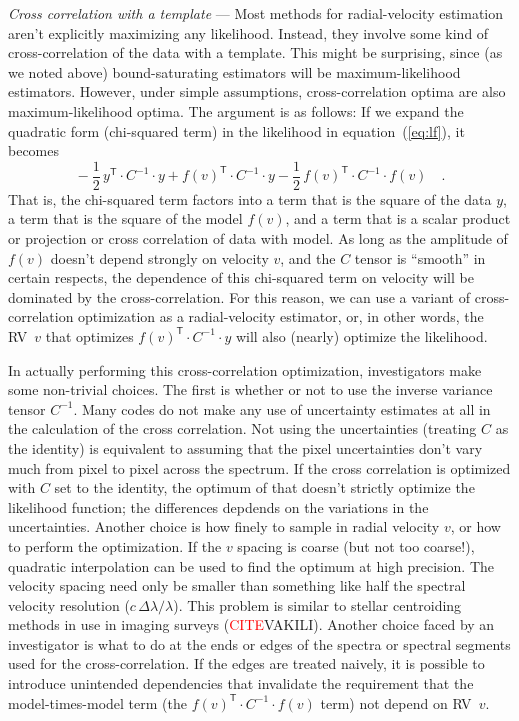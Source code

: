 \documentclass[modern]{aastex631}
\newcommand{\T}{^{\mathsf{T}}}
\renewcommand{\paragraph}[1]{\bigskip\par\noindent\textsl{#1} ---}
\newcommand{\todo}[1]{\textcolor{red}{#1}}  %
\newcommand{\CITE}{\todo{CITE}}
\newcommand{\acronym}[1]{{\small{#1}}}
\newcommand{\RV}{\acronym{RV}}
\begin{document}
\paragraph{Cross correlation with a template}
Most methods for radial-velocity estimation aren't explicitly maximizing
any likelihood.
Instead, they involve some kind of
cross-correlation of the data with a template.
This might be surprising, since (as we noted above) bound-saturating
estimators will be maximum-likelihood estimators.
However, under simple assumptions, cross-correlation optima are
also maximum-likelihood optima. The argument is as follows:
If we expand the quadratic form (chi-squared term) in the
likelihood in equation~(\ref{eq:lf}), it becomes
\begin{equation}
 {}-\frac{1}{2}\,y\T\cdot C^{-1}\cdot y
            + f(v)\T\cdot C^{-1}\cdot y
-\frac{1}{2}\,f(v)\T\cdot C^{-1}\cdot f(v) \quad.
\end{equation}
That is, the chi-squared term factors into a term that is the square
of the data $y$, a term that is the square of the model $f(v)$,
and a term that is a scalar product or projection or
cross correlation of data with model.
As long as the amplitude of $f(v)$ doesn't depend strongly on velocity $v$,
and the $C$ tensor is ``smooth'' in certain respects, the dependence of this
chi-squared term on velocity will be dominated by the
cross-correlation.
For this reason, we can use a variant of cross-correlation
optimization as a radial-velocity estimator, or, in other words, the
\RV\ $v$ that optimizes $f(v)\T\cdot C^{-1}\cdot y$ will also (nearly)
optimize the likelihood.

In actually performing this cross-correlation optimization,
investigators make some non-trivial choices.
The first is whether or not to use the inverse variance tensor $C^{-1}$.
Many codes do not make any use of uncertainty estimates at all in
the calculation of the cross correlation.
Not using the uncertainties (treating $C$ as the identity) is
equivalent to assuming that the pixel uncertainties don't vary much
from pixel to pixel across the spectrum.
If the cross correlation is optimized with $C$ set to the identity,
the optimum of that doesn't strictly optimize the likelihood function;
the differences depdends on the variations in the uncertainties.
Another choice is how finely to sample in radial velocity $v$, or how
to perform the optimization.
If the $v$ spacing is coarse (but not too coarse!), quadratic
interpolation can be used to find the optimum at high precision.
The velocity spacing need only be smaller than something like half the
spectral velocity resolution ($c\,\Delta\lambda / \lambda$).
This problem is similar to stellar centroiding methods in use in
imaging surveys (\CITE VAKILI).
Another choice faced by an investigator is what to do at the ends or
edges of the spectra or spectral segments used for the
cross-correlation.
If the edges are treated naively, it is possible to introduce unintended
dependencies that invalidate the requirement that the model-times-model term
(the $f(v)\T\cdot C^{-1}\cdot f(v)$ term) not depend on \RV\ $v$.
\end{document}
